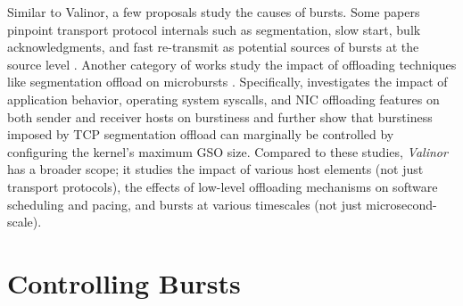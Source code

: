 Similar to Valinor, a few proposals study the causes of bursts.
Some papers pinpoint transport protocol internals such as segmentation, slow start, bulk acknowledgments, and fast re-transmit as potential sources of bursts at the source level \cite{ipbursts, notes,burstiness}. 
Another category of works study the impact of offloading techniques like segmentation offload on microbursts \cite{bullet,high-resolution}.
Specifically, \cite{bullet} investigates the impact of application behavior, operating system syscalls,  and NIC offloading features on both sender and receiver hosts on burstiness and further show that burstiness imposed by TCP segmentation offload can marginally be controlled by configuring the kernel's maximum GSO size. 
Compared to these studies, \textit{Valinor} has a broader scope; it studies the impact of various host elements (not just transport protocols), the effects of low-level offloading mechanisms on software scheduling and pacing, and bursts at various timescales (not just microsecond-scale).


\section{Controlling Bursts}


